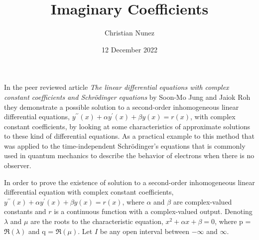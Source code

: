\documentclass[mla8]{mla}
\title{Imaginary Coefficients}
\author{Christian Nunez}
\date{12 December 2022}
\begin{document}
\begin{paper}

In the peer reviewed article \textit{The linear differential equations with complex constant coefficients and Schrödinger equations} by Soon-Mo Jung and Jaiok Roh they demonstrate a possible solution to a second-order inhomogeneous linear differential equations, $y^{\prime \prime}(x)+\alpha y^{\prime}(x)+\beta y(x)=r(x)$, with complex constant coefficients, by looking at some characteristics of approximate solutions to these kind of differential equations. As a practical example to this method that was applied to the time-independent Schrödinger's equations that is commonly used in quantum mechanics to describe the behavior of electrons when there is no observer.

In order to prove the existence of solution to a second-order inhomogeneous linear differential equation with complex constant coefficients, $y^{\prime \prime}(x)+\alpha y^{\prime}(x)+\beta y(x)=r(x)$, where $\alpha$ and $\beta$ are complex-valued constants and $\mathit{r}$ is a continuous function with a complex-valued output. Denoting $\lambda$ and $\mu$ are the roots to the characteristic equation, $x^2+\alpha x + \beta = 0$, where p = $\Re(\lambda)$ and q = $\Re(\mu)$. Let $\mathit{I}$ be any open interval between $-\infty$ and $\infty$.

\end{paper}
\printbibliography
\end{document}

